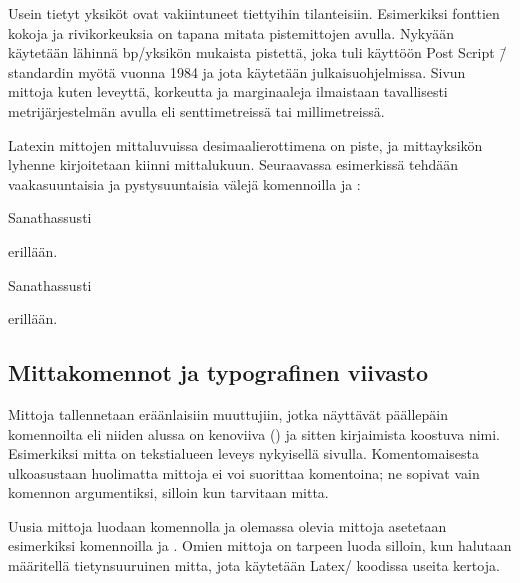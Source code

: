 Usein tietyt yksiköt ovat vakiintuneet tiettyihin tilanteisiin.
Esimerkiksi fonttien kokoja ja rivikorkeuksia on tapana mitata
pistemittojen avulla. Nykyään käytetään lähinnä bp\-/yksikön mukaista
pistettä, joka tuli käyttöön Post Script \=/standardin myötä vuonna 1984
ja jota käytetään julkaisuohjelmissa. Sivun mittoja kuten leveyttä,
korkeutta ja marginaaleja ilmaistaan tavallisesti metrijärjestelmän
avulla eli senttimetreissä tai millimetreissä.

Latexin mittojen mittaluvuissa desimaalierottimena on piste, ja
mittayksikön lyhenne kirjoitetaan kiinni mittalukuun. Seuraavassa
esimerkissä tehdään vaakasuuntaisia ja pystysuuntaisia välejä
komennoilla  ja :

\begin{koodilohkosis}
Sanat\hspace{1.2cm}hassusti
\vspace{2mm}

\hspace{1.75em}erillään.
\end{koodilohkosis}

\begin{tulossis}
  Sanat\hspace{1.2cm}hassusti  \nopagebreak
  \vspace{2mm}

  \hspace{1.75em}erillään.
\end{tulossis}

\subsection{Mittakomennot ja typografinen viivasto}

Mittoja tallennetaan eräänlaisiin muuttujiin, jotka näyttävät päällepäin
komennoilta eli niiden alussa on kenoviiva (\koodi{\keno}) ja sitten
kirjaimista koostuva nimi. Esimerkiksi mitta  on
tekstialueen leveys nykyisellä sivulla. Komentomaisesta ulkoasustaan
huolimatta mittoja ei voi suorittaa komentoina; ne sopivat vain komennon
argumentiksi, silloin kun tarvitaan mitta.

Uusia mittoja luodaan komennolla  ja olemassa olevia
mittoja asetetaan esimerkiksi komennoilla  ja
. Omien mittoja on tarpeen luoda silloin, kun
halutaan määritellä tietynsuuruinen mitta, jota käytetään Latex\-/
koodissa useita kertoja.

